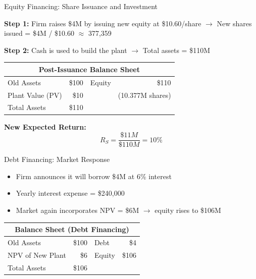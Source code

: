 \begin{frame}{Equity Financing: Share Issuance and Investment}
	
	\textbf{Step 1:} Firm raises \$4M by issuing new equity at \$10.60/share  
	$\rightarrow$ New shares issued = \$4M / \$10.60 $\approx$ 377,359
	
	\textbf{Step 2:} Cash is used to build the plant $\rightarrow$ Total assets = \$110M
	
	\begin{table}
		\centering
		\begin{tabular}{lrlr}
			\toprule
			\multicolumn{4}{c}{\textbf{Post-Issuance Balance Sheet}} \\ \midrule
			Old Assets        & \$100 & Equity & \$110 \\
			Plant Value (PV)  & \$10  &        & (10.377M shares) \\
			Total Assets      & \$110 &        &       \\ \bottomrule
		\end{tabular}
	\end{table}
	
	\textbf{New Expected Return:}  
	\[
	R_S = \frac{\$11M}{\$110M} = 10\%
	\]
\end{frame}

\begin{frame}{Debt Financing: Market Response}
	
	\begin{itemize}
		\item Firm announces it will borrow \$4M at 6\% interest
		\item Yearly interest expense = \$240,000
		\item Market again incorporates NPV = \$6M $\rightarrow$ equity rises to \$106M
	\end{itemize}
	
	\begin{table}
		\centering
		\begin{tabular}{lrlr}
			\toprule
			\multicolumn{4}{c}{\textbf{Balance Sheet (Debt Financing)}} \\ \midrule
			Old Assets        & \$100 & Debt   & \$4   \\
			NPV of New Plant  & \$6   & Equity & \$106 \\
			Total Assets      & \$106 &        &       \\ \bottomrule
		\end{tabular}
	\end{table}
	
\end{frame}

